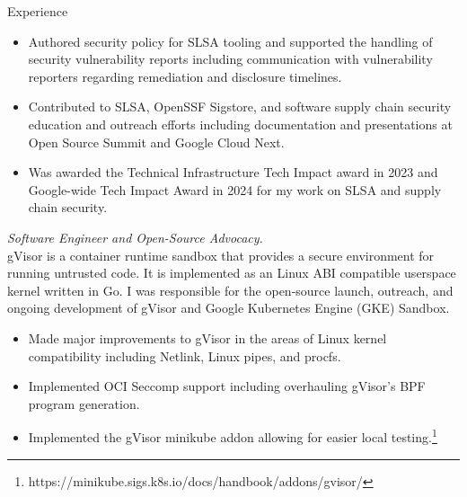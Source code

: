 \documentclass{resume}
\begin{document}
\begin{category}{Experience}
\begin{itemize}
\begin{itemize}
            \item Authored security policy for SLSA tooling and supported the
                handling of security vulnerability reports including
                communication with vulnerability reporters regarding
                remediation and disclosure timelines.

            \item Contributed to SLSA, OpenSSF Sigstore, and software supply
                chain security education and outreach efforts including
                documentation and presentations at Open Source Summit and Google
                Cloud Next.

                \item Was awarded the Technical Infrastructure Tech Impact
                    award in 2023 and Google-wide Tech Impact Award in 2024 for
                    my work on SLSA and supply chain security.

        \end{itemize}

    \end{itemize}

    \begin{itemize}

         \emph{Software Engineer and Open-Source Advocacy.}\\
            gVisor is a container runtime sandbox that provides a secure
            environment for running untrusted code. It is implemented as an
            Linux ABI compatible userspace kernel written in Go. I was
            responsible for the open-source launch, outreach, and ongoing
            development of gVisor and Google Kubernetes Engine (GKE) Sandbox.

        \begin{itemize}

            \item Made major improvements to gVisor in the areas of Linux kernel
                compatibility including Netlink, Linux pipes, and procfs.

            \item Implemented OCI Seccomp support including overhauling gVisor's
                BPF program generation.

            \item Implemented the gVisor minikube addon allowing for easier
                local
                testing.\footnote{https://minikube.sigs.k8s.io/docs/handbook/addons/gvisor/}


\end{itemize}
\end{itemize}
\end{category}
\end{document}
